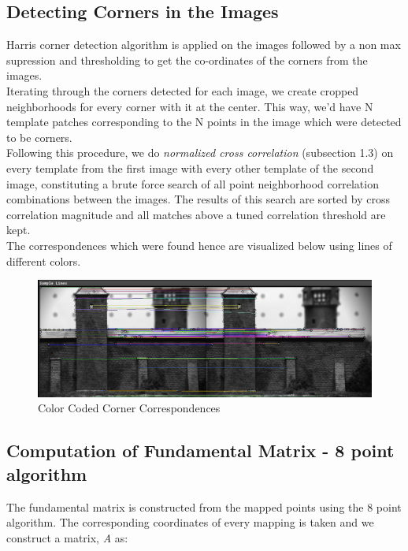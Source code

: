 \documentclass[letterpaper,11pt]{article}
\begin{document}
\subsection{Detecting Corners in the Images}
Harris corner detection algorithm is applied on the images followed by a non max
supression and thresholding to get the co-ordinates of the corners
from the images. \\

Iterating through the corners detected for each image, we create
cropped neighborhoods for every corner with it at the center.
This way, we'd have N template patches corresponding to the N points
in the image which were detected to be corners. \\

Following this procedure, we do \textit{normalized cross correlation}
(subsection 1.3) on every template from the first image with every
other template of the second image, constituting a brute force search
of all point neighborhood correlation combinations between the
images. The results of this search are sorted by cross correlation
magnitude and all matches above a tuned correlation threshold are
kept. \\

The correspondences which were found hence are visualized below using lines of different
colors.

\begin{figure}[h]
  \centering
  \includegraphics[width=\linewidth]{images/correspondences.png}
  \caption{Color Coded Corner Correspondences}
  \label{fig:sfig1}
\end{figure}

\subsection{Computation of Fundamental Matrix - 8 point algorithm}

The fundamental matrix is constructed from the mapped points using the 8 point algorithm.
The corresponding coordinates of every mapping is taken and we construct a matrix, \textit{A}
as: \\
\end{document}
